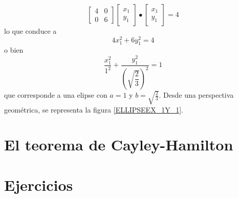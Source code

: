 \begin{example}
{
    }
    $$\begin{bmatrix}
        4 & 0 \\
        0 & 6
    \end{bmatrix} \begin{bmatrix}
        x_1 \\
        y_1
    \end{bmatrix} \bullet \begin{bmatrix}
        x_1 \\
        y_1
    \end{bmatrix} = 4$$
    lo que conduce a
    $$4x_1^2 + 6y_1^2 = 4$$
    o bien
    $$\frac{x_1^2}{1^2} + \frac{y_1^2}{\left(\sqrt{\dfrac{2}{3}}\right)^2} = 1$$
    que corresponde a una elipse con $a = 1$ y $\displaystyle b = \sqrt{\frac{2}{3}}$. Desde una perspectiva geométrica, se representa la figura \ref{ELLIPSEEX_1Y_1}.
\end{example}


\section{El teorema de Cayley-Hamilton}

\newpage

\section{Ejercicios}

